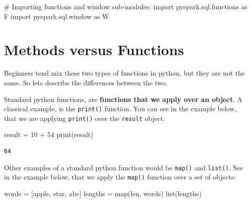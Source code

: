 \documentclass[
  11pt,
  letterpaper,
  DIV=11,
  numbers=noendperiod]{scrreprt}
\newenvironment{Shaded}{\begin{snugshade}}{\end{snugshade}}
\newcommand{\BuiltInTok}[1]{\textcolor[rgb]{0.00,0.23,0.31}{#1}}
\newcommand{\CommentTok}[1]{\textcolor[rgb]{0.37,0.37,0.37}{#1}}
\newcommand{\DecValTok}[1]{\textcolor[rgb]{0.68,0.00,0.00}{#1}}
\newcommand{\ImportTok}[1]{\textcolor[rgb]{0.00,0.46,0.62}{#1}}
\newcommand{\NormalTok}[1]{\textcolor[rgb]{0.00,0.23,0.31}{#1}}
\newcommand{\OperatorTok}[1]{\textcolor[rgb]{0.37,0.37,0.37}{#1}}
\newcommand{\StringTok}[1]{\textcolor[rgb]{0.13,0.47,0.30}{#1}}
\begin{document}
\begin{Shaded}
\begin{Highlighting}[]
\CommentTok{\# Importing \textasciigrave{}functions\textasciigrave{} and \textasciigrave{}window\textasciigrave{} sub{-}modules:}
\ImportTok{import}\NormalTok{ pyspark.sql.functions }\ImportTok{as}\NormalTok{ F}
\ImportTok{import}\NormalTok{ pyspark.sql.window }\ImportTok{as}\NormalTok{ W}
\end{Highlighting}
\end{Shaded}

\section{Methods versus Functions}\label{methods-versus-functions}

Beginners tend mix these two types of functions in python, but they are
not the same. So lets describe the differences between the two.

Standard python functions, are \textbf{functions that we apply over an
object}. A classical example, is the \texttt{print()} function. You can
see in the example below, that we are applying \texttt{print()} over the
\texttt{result} object.

\begin{Shaded}
\begin{Highlighting}[]
\NormalTok{result }\OperatorTok{=} \DecValTok{10} \OperatorTok{+} \DecValTok{54}
\BuiltInTok{print}\NormalTok{(result)}
\end{Highlighting}
\end{Shaded}

\begin{verbatim}
64
\end{verbatim}

Other examples of a standard python function would be \texttt{map()} and
\texttt{list()}. See in the example below, that we apply the
\texttt{map()} function over a set of objects:

\begin{Shaded}
\begin{Highlighting}[]
\NormalTok{words }\OperatorTok{=}\NormalTok{ [}\StringTok{\textquotesingle{}apple\textquotesingle{}}\NormalTok{, }\StringTok{\textquotesingle{}star\textquotesingle{}}\NormalTok{, }\StringTok{\textquotesingle{}abc\textquotesingle{}}\NormalTok{]}
\NormalTok{lengths }\OperatorTok{=} \BuiltInTok{map}\NormalTok{(}\BuiltInTok{len}\NormalTok{, words)}
\BuiltInTok{list}\NormalTok{(lengths)}
\end{Highlighting}
\end{Shaded}
\end{document}
